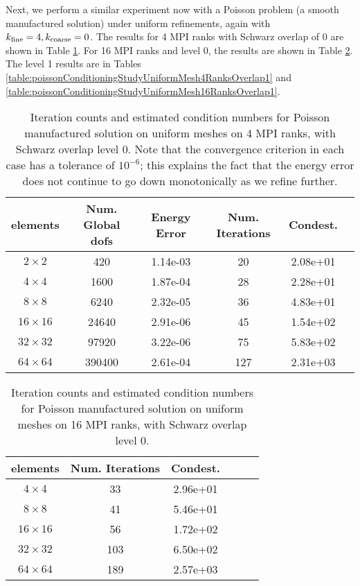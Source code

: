 \documentclass[11pt]{amsart}
\begin{document}
Next, we perform a similar experiment now with a Poisson problem (a smooth manufactured solution) under uniform refinements, again with $k_{\rm fine} = 4, k_{\rm coarse} = 0$.  The results for 4 MPI ranks with Schwarz overlap of 0 are shown in Table \ref{table:poissonConditioningStudyUniformMesh4RanksOverlap0}.  For 16 MPI ranks and level 0, the results are shown in Table \ref{table:poissonConditioningStudyUniformMesh16RanksOverlap0}.  The level 1 results are in Tables \ref{table:poissonConditioningStudyUniformMesh4RanksOverlap1} and \ref{table:poissonConditioningStudyUniformMesh16RanksOverlap1}.

\begin{table}
\begin{tabular}{ c  c  c  c  c  c }
elements	& Num. Global dofs	&Energy Error	&Num. Iterations	&Condest.		\\
\hline
$2 \times 2$	&420			&1.14e-03		&20		&2.08e+01\\
$4 \times 4$	&1600		&1.87e-04		&28		&2.28e+01\\
$8 \times 8$	&6240		&2.32e-05		&36		&4.83e+01\\
$16 \times 16$	&24640		&2.91e-06		&45		&1.54e+02\\
$32 \times 32$	&97920		&3.22e-06		&75		&5.83e+02\\
$64 \times 64$	&390400		&2.61e-04		&127		&2.31e+03\\
\end{tabular}
\caption{Iteration counts and estimated condition numbers for Poisson manufactured solution on uniform meshes on 4 MPI ranks, with Schwarz overlap level 0.  Note that the convergence criterion in each case has a tolerance of $10^{-6}$; this explains the fact that the energy error does not continue to go down monotonically as we refine further.}
\label{table:poissonConditioningStudyUniformMesh4RanksOverlap0}
\end{table}

\begin{table}
\begin{tabular}{ c  c  c  c  c  c }
elements	&Num. Iterations	&Condest.		\\
\hline
$4 \times 4$			&33		&2.96e+01\\
$8 \times 8$			&41		&5.46e+01\\
$16 \times 16$			&56		&1.72e+02\\
$32 \times 32$			&103		&6.50e+02\\
$64 \times 64$			&189 	&2.57e+03\\
\end{tabular}
\caption{Iteration counts and estimated condition numbers for Poisson manufactured solution on uniform meshes on 16 MPI ranks, with Schwarz overlap level 0.}
\label{table:poissonConditioningStudyUniformMesh16RanksOverlap0}
\end{table}
\end{document}
